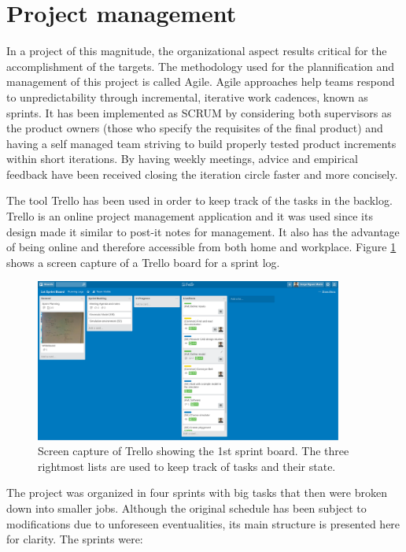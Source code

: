 \section{Project management} %
\label{sec:project_management}
In a project of this magnitude, the organizational aspect results critical for the accomplishment of the targets.
The methodology used for the plannification and management of this project is called Agile.
Agile approaches help teams respond to unpredictability through incremental, iterative work cadences, known as sprints.
It has been implemented as SCRUM \cite{singh2008u} by considering both supervisors as the product owners (those who specify the requisites of the final product) and having a self managed team striving to build properly tested product increments within short iterations.
By having weekly meetings, advice and empirical feedback have been received closing the iteration circle faster and more concisely.

The tool Trello \cite{trello} has been used in order to keep track of the tasks in the backlog.
Trello is an online project management application and it was used since its design made it similar to post-it notes for management.
It also has the advantage of being online and therefore accessible from both home and workplace.
Figure \ref{fig:trello} shows a screen capture of a Trello board for a sprint log.

\begin{figure}[ht]
  \centering
  \includegraphics[width=0.9\textwidth]{figures/trello.png}
  \caption{Screen capture of Trello showing the 1st sprint board. The three
rightmost lists are used to keep track of tasks and their state.}
  \label{fig:trello}
\end{figure}

The project was organized in four sprints with big tasks that then were broken down into smaller jobs. 
Although the original schedule has been subject to modifications due to unforeseen eventualities, its main structure is presented here for clarity.
The sprints were:
\vfill
